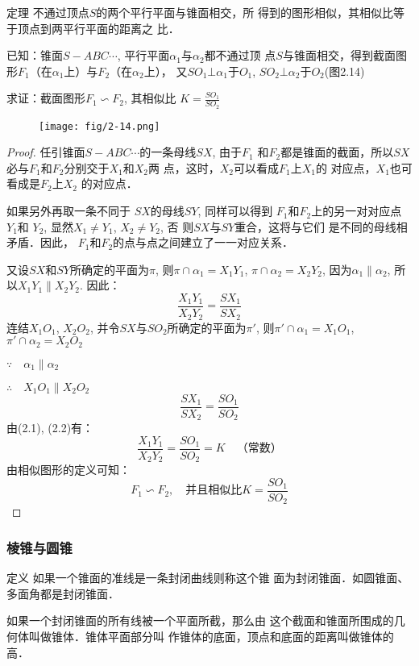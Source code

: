 \begin{blk}
    {定理} 不通过顶点$S$的两个平行平面与锥面相交，所
    得到的图形相似，其相似比等于顶点到两平行平面的距离之
    比．
\end{blk}

已知：锥面$S-ABC\cdots$, 平行平面$\alpha_1$与$\alpha_2$都不通过顶
点$S$与锥面相交，得到截面图形$F_1$（在$\alpha_1$上）与$F_2$（在$\alpha_2$上），
又$SO_1\bot\alpha_1$于$O_1$, $SO_2\bot\alpha_2$于$O_2$(图2.14)

求证：截面图形$F_1\backsim F_2$, 其相似比
$K=\frac{SO_1}{SO_2}$

\begin{figure}[htp]
    \centering
\texttt{[image: fig/2-14.png]}
    \caption{}
\end{figure}

\begin{proof}
任引锥面$S-ABC\cdots$的一条母线$SX$, 由于$F_1$
和$F_2$都是锥面的截面，所以$SX$
必与$F_1$和$F_2$分别交于$X_1$和$X_2$两
点，这时，$X_2$可以看成$F_1$上$X_1$的
对应点，$X_1$也可看成是$F_2$上$X_2$
的对应点．

如果另外再取一条不同于
$SX$的母线$SY$, 同样可以得到
$F_1$和$F_2$上的另一对对应点$Y_1$和
$Y_2$, 显然$X_1\ne Y_1$, $X_2\ne Y_2$, 否
则$SX$与$SY$重合，这将与它们
是不同的母线相矛盾．因此，
$F_1$和$F_2$的点与点之间建立了一一对应关系．

又设$SX$和$SY$所确定的平面为$\pi$, 则$\pi\cap \alpha_1=X_1Y_1$,
$\pi\cap \alpha_2=X_2Y_2$, 因为$\alpha_1\parallel \alpha_2$, 所以$X_1Y_1\parallel X_2Y_2$. 因此：
\begin{equation}
    \frac{X_1Y_1}{X_2Y_2}=\frac{SX_1}{SX_2}
\end{equation}
连结$X_1O_1$, $X_2O_2$, 并令$SX$与$SO_2$所确定的平面为$\pi'$, 
则$\pi'\cap\alpha_1=X_1O_1$, $\pi'\cap\alpha_2=X_2O_2$

$\because\quad \alpha_1\parallel \alpha_2$

$\therefore\quad X_1O_1\parallel X_2O_2$
\begin{equation}
    \frac{SX_1}{SX_2}=\frac{SO_1}{SO_2}
\end{equation}
由(2.1), (2.2)有：
\[\frac{X_1Y_1}{X_2Y_2}=\frac{SO_1}{SO_2}=K\quad\text{（常数）}\]
由相似图形的定义可知：
\[F_1\backsim F_2,\quad \text{并且相似比}K=\frac{SO_1}{SO_2}\]
\end{proof}

\subsubsection{棱锥与圆锥}
\begin{blk}
   {定义} 如果一个锥面的准线是一条封闭曲线则称这个锥
面为封闭锥面．如圆锥面、多面角都是封闭锥面．

如果一个封闭锥面的所有线被一个平面所截，那么由
这个截面和锥面所围成的几何体叫做锥体．锥体平面部分叫
作锥体的底面，顶点和底面的距离叫做锥体的高． 
\end{blk}


